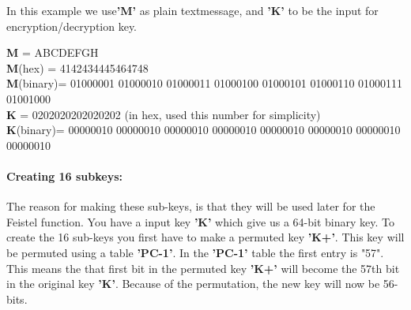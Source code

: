 In this example we use\textbf{'M'} as plain textmessage, and \textbf{'K'} to be the input for encryption/decryption key.

\textbf{M} = ABCDEFGH\\
\textbf{M}(hex) = 4142434445464748\\
\textbf{M}(binary)= 01000001 01000010 01000011 01000100 01000101 01000110 01000111 01001000\\
\bigskip
\textbf{K} = 0202020202020202 (in hex, used this number for simplicity)\\
\textbf{K}(binary)= 00000010 00000010 00000010 00000010 00000010 00000010 00000010 00000010\\
\paragraph{Creating 16 subkeys:}
\bigskip
The reason for making these sub-keys, is that they will be used later for the Feistel function. You have a input key \textbf{'K'} which give us a 64-bit binary key. To create the 16 sub-keys you first have to make a permuted key \textbf{'K+'}. This key will be permuted using a table \textbf{'PC-1'}. In the \textbf{'PC-1'} table the first entry is "57"\cite{tableWiki}. This means the that first bit in the permuted key \textbf{'K+'} will become the 57th bit in the original key \textbf{'K'}. Because of the permutation, the new key will now be 56-bits.\cite{des1,des3}
\bigskip

